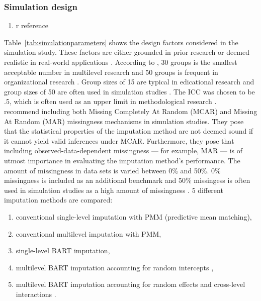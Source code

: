 \documentclass[10pt, a4paper, titlepage]{article}
\begin{document}
\subsubsection{Simulation design} \label{sec:simulation}
\begin{enumerate}
    \item r reference
\end{enumerate}
Table~\ref{tab:simulationparameters} shows the design factors considered in the simulation study. These factors are either grounded in prior research or deemed realistic in real-world applications \citep{gulliford1999, murray2003, hox2017, grund2018, enders2018a, enders2020}. According to \citet{kreft2007}, 30 groups is the smallest acceptable number in multilevel research and 50 groups is frequent in organizational research \citep{maas2005}. Group sizes of 15 are typical in edicational research \citep{ludtke2017} and group sizes of 50 are often used in simulation studies \citep{maas2005,enders2018,akkayahocagil2023,grund2018,enders2018a,enders2020}. The ICC was chosen to be .5, which is often used as an upper limit in methodological research \citep{enders2020,enders2018,enders2018a,mistler2017,grund2018,salditt2023}.~\citet{oberman2023} recommend including both Missing Completely At Random (MCAR) and Missing At Random (MAR) missingness mechanisms in simulation studies. They pose that the statistical properties of the imputation method are not deemed sound if it cannot yield valid inferences under MCAR. Furthermore, they pose that including observed-data-dependent missingness --- for example, MAR --- is of utmost importance in evaluating the imputation method's performance. The amount of missingness in data sets is varied between 0\% and 50\%. 0\% missingness is included as an additional benchmark and 50\% missingess is often used in simulation studies as a high amount of missingness \citep{ludtke2017,grund2016,schouten2021}. 5 different imputation methods are compared: 
\begin{enumerate}
    \item conventional single-level imputation with PMM (predictive mean matching),
    \item conventional multilevel imputation with PMM,
    \item single-level BART imputation,
    \item multilevel BART imputation accounting for random intercepts \citep{chen2020, wagner2020, tan2016},
    \item multilevel BART imputation accounting for random effects and cross-level interactions \citep{dorie2022}.
\end{enumerate} 
\end{document}
